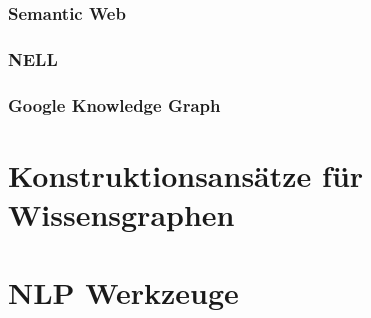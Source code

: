 \subsubsection{Semantic Web}
\label{sec:related:kr:today:sw}

\subsubsection{NELL}
\label{sec:related:kr:today:nell}

\subsubsection{Google Knowledge Graph}
\label{sec:related:kr:today:google-kg}

\section{Konstruktionsansätze für Wissensgraphen}
\label{sec:related:kbc}

\section{NLP Werkzeuge}
\label{sec:related:nlp}
